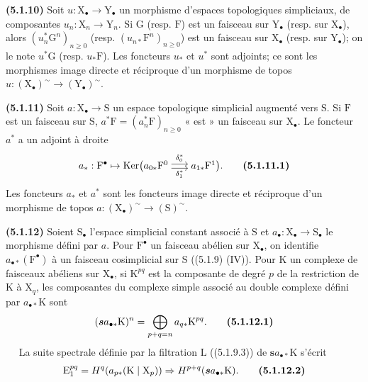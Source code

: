\documentclass[11pt,leqno]{article}
\newcommand{\Page}[1]{\ifvmode\noindent\else\unskip\ \fi{\footnotesize\textcolor{gray}{[p.\,#1]}}\ \ignorespaces}
\begin{document}
\textbf{(5.1.10)} Soit \(u:\mathrm{X}_{\bullet}\to\mathrm{Y}_{\bullet}\) un morphisme d’espaces topologiques simpliciaux, de composantes \(u_n:\mathrm{X}_n\to\mathrm{Y}_n\). Si \(\mathrm{G}\) (resp. \(\mathrm{F}\)) est un faisceau sur \(\mathrm{Y}_{\bullet}\) (resp. sur \(\mathrm{X}_{\bullet}\)), alors \((u_n^*\mathrm{G}^n)_{n\geq0}\) (resp. \((u_{n*}\mathrm{F}^n)_{n\geq0}\)) est un faisceau sur \(\mathrm{X}_{\bullet}\) (resp. sur \(\mathrm{Y}_{\bullet}\)); on le note \(u^*\mathrm{G}\) (resp. \(u_*\mathrm{F}\)). Les foncteurs \(u_*\) et \(u^*\) sont adjoints; ce sont les morphismes image directe et réciproque d’un morphisme de topos \(u:(\mathrm{X}_{\bullet})^{\sim}\to(\mathrm{Y}_{\bullet})^{\sim}\).

\textbf{(5.1.11)} Soit \(a:\mathrm{X}_{\bullet}\to\mathrm{S}\) un espace topologique simplicial augmenté vers \(\mathrm{S}\). Si \(\mathrm{F}\) est un faisceau sur \(\mathrm{S}\), \(a^*\mathrm{F}=(a_n^*\mathrm{F})_{n\geq0}\) « est » un faisceau sur \(\mathrm{X}_{\bullet}\). Le foncteur \(a^*\) a un adjoint à droite
\[
a_*:\mathrm{F}^{\bullet}\mapsto
\operatorname{Ker}\bigl(
\begin{tikzcd}[ampersand replacement=\&, cramped, column sep=1.7em, baseline=-0.5ex]
a_{0*}\mathrm{F}^0
  \arrow[r, shift left=0.5ex, "\delta_0^*"]
  \arrow[r, shift right=0.5ex, "\delta_1^*"']
\& a_{1*}\mathrm{F}^1
\end{tikzcd}
\bigr).
\tag*{\textbf{(5.1.11.1)}}
\]
Les foncteurs \(a_*\) et \(a^*\) sont les foncteurs image directe et réciproque d’un morphisme de topos \(a:(\mathrm{X}_{\bullet})^{\sim}\to(\mathrm{S})^{\sim}\).

\textbf{(5.1.12)} Soient \(\mathrm{S}_{\bullet}\) l’espace simplicial constant associé à \(\mathrm{S}\) et \(a_{\bullet}:\mathrm{X}_{\bullet}\to\mathrm{S}_{\bullet}\) le morphisme défini par \(a\). Pour \(\mathrm{F}^{\bullet}\) un faisceau abélien sur \(\mathrm{X}_{\bullet}\), on identifie \(a_{\bullet *}(\mathrm{F}^{\bullet})\) à un faisceau cosimplicial sur \(\mathrm{S}\) ((5.1.9) (IV)). Pour \(\mathrm{K}\) un complexe de faisceaux abéliens sur \(\mathrm{X}_{\bullet}\), si \(\mathrm{K}^{pq}\) est la composante de degré \(p\) de la restriction de \(\mathrm{K}\) à \(\mathrm{X}_q\), les composantes du complexe simple associé au double complexe défini par \(a_{\bullet *}\mathrm{K}\) sont
\[
(\boldsymbol{s}a_{\bullet *}\mathrm{K})^n
=\bigoplus_{p+q=n}a_{q*}\mathrm{K}^{pq}.
\tag*{\textbf{(5.1.12.1)}}
\]
\Page{12}
La suite spectrale définie par la filtration \(\mathrm{L}\) ((5.1.9.3)) de \(\boldsymbol{s}a_{\bullet *}\mathrm{K}\) s’écrit
\[
\mathrm{E}_1^{pq}
=H^q(a_{p*}(\mathrm{K}\mid\mathrm{X}_{p}))
\Rightarrow H^{p+q}(\boldsymbol{s}a_{\bullet *}\mathrm{K}).
\tag*{\textbf{(5.1.12.2)}}
\]
\end{document}

